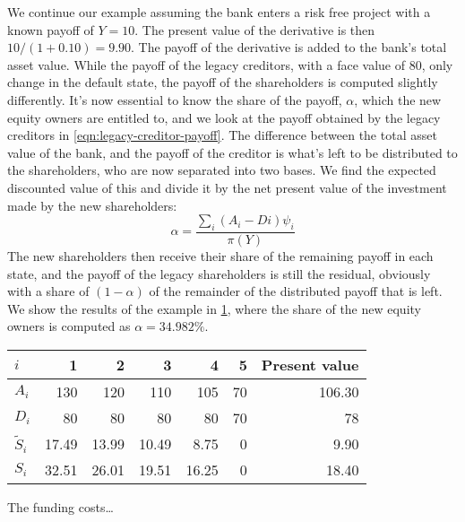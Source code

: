 \documentclass[../main.tex]{subfiles}
\begin{document}
        We continue our example assuming the bank enters a risk free project with a known payoff of $Y=10$. The present value of the derivative is then $10/(1+0.10)=9.90$. The payoff of the derivative is added to the bank's total asset value. While the payoff of the legacy creditors, with a face value of 80, only change in the default state, the payoff of the shareholders is computed slightly differently. It's now essential to know the share of the payoff, $\alpha$, which the new equity owners are entitled to, and we look at the payoff obtained by the legacy creditors in \cref{eqn:legacy-creditor-payoff}. The difference between the total asset value of the bank, and the payoff of the creditor is what's left to be distributed to the shareholders, who are now separated into two bases. We find the expected discounted value of this and divide it by the net present value of the investment made by the new shareholders:
        \begin{equation}
            \alpha = \frac{\sum_i (A_{i}-D{i})\psi_{i}}{\pi(Y)}
        \end{equation}
        The new shareholders then receive their share of the remaining payoff in each state, and the payoff of the legacy shareholders is still the residual, obviously with a share of $(1-\alpha)$ of the remainder of the distributed payoff that is left. We show the results of the example in \cref{tbl:equity-funding-payoff}, where the share of the new equity owners is computed as $\alpha = 34.982\%$.
        
        \begin{table}[h]
            \centering\begin{tabular}{l|rrrrr||r}
                $i$ & 1 & 2 & 3 & 4 & 5 & Present value \\
                \hline
                $A_{i}$ & 130 & 120 & 110 & 105 & 70 & 106.30 \\
                $D_{i}$ & 80 & 80 & 80 & 80 & 70 & 78 \\
                $\tilde{S}_{i}$ & 17.49 & 13.99 & 10.49 & 8.75 & 0 & 9.90 \\
                $S_{i}$ & 32.51 & 26.01 & 19.51 & 16.25 & 0 & 18.40 \\
            \end{tabular}
            \label{tbl:equity-funding-payoff}
        \end{table}

        The funding costs\dots
\end{document}
